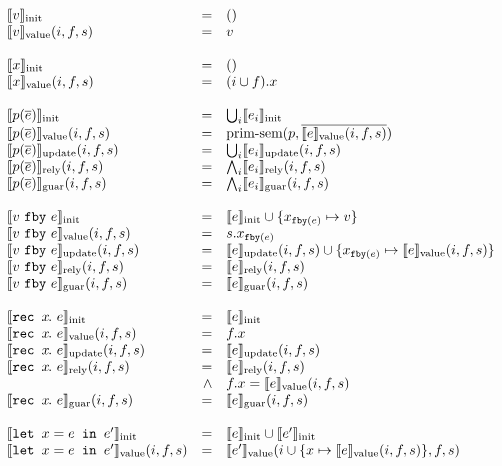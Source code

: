 \documentclass[a4paper,UKenglish,cleveref, autoref, thm-restate,anonymous]{lipics-v2021}
\begin{document}
\begin{figure}
  \small
  \[
  \begin{array}{lrl}
    \sysinit{v} & = & () \\
    \sysvalue{v}(i, f, s) & = & v \\
\\
    \sysinit{x} & = & () \\
    \sysvalue{x}(i, f, s) & = & (i \cup f).x \\
\\
    \sysinit{p(\ov{e})} & = & \bigcup_i \sysinit{e_i} \\
    \sysvalue{p(\ov{e})}(i, f, s) & = & \text{prim-sem}(p, \ov{\sysvalue{e}(i, f, s)}) \\
    \sysupdate{p(\ov{e})}(i, f, s) & = & \bigcup_i \sysupdate{e_i}(i, f, s) \\
    \sysrely{p(\ov{e})}(i, f, s) & = & \bigwedge_i \sysrely{e_i}(i, f, s) \\
    \sysguar{p(\ov{e})}(i, f, s) & = & \bigwedge_i \sysguar{e_i}(i, f, s) \\
    \\
    \sysinit{\xfby{v}{e}} & = & \sysinit{e} \cup \{ x_{\tt{fby}(e)} \mapsto v \} \\
    \sysvalue{\xfby{v}{e}}(i, f, s) & = & s.x_{\tt{fby}(e)} \\
    \sysupdate{\xfby{v}{e}}(i, f, s) & = & \sysupdate{e}(i, f, s) \cup \{x_{\tt{fby}(e)} \mapsto \sysvalue{e}(i, f, s)\}\\
    \sysrely{\xfby{v}{e}}(i, f, s) & = & \sysrely{e}(i, f, s) \\
    \sysguar{\xfby{v}{e}}(i, f, s) & = & \sysguar{e}(i, f, s) \\
    \\
    \sysinit{\xrec{x}{e}} & = & \sysinit{e} \\
    \sysvalue{\xrec{x}{e}}(i, f, s) & = & f.x \\
    \sysupdate{\xrec{x}{e}}(i, f, s) & = & \sysupdate{e}(i, f, s)\\
    \sysrely{\xrec{x}{e}}(i, f, s) & = & \sysrely{e}(i, f, s) \\
          & \wedge & f.x = \sysvalue{e}(i, f, s) \\
    \sysguar{\xrec{x}{e}}(i, f, s) & = & \sysguar{e}(i, f, s) \\
    \\
    \sysinit{\xlet{x}{e}{e'}} & = & \sysinit{e} \cup \sysinit{e'} \\
    \sysvalue{\xlet{x}{e}{e'}}(i, f, s) & = & \sysvalue{e'}(i \cup \{ x \mapsto \sysvalue{e}(i, f, s)\}, f, s) \\

\end{array}\]
\end{figure}
\end{document}
